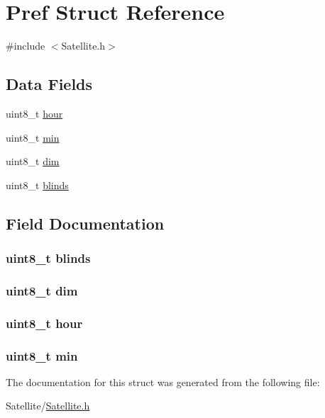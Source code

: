 \hypertarget{struct_pref}{\section{Pref Struct Reference}
\label{struct_pref}
}


{\ttfamily \#include $<$Satellite.\-h$>$}

\subsection*{Data Fields}
\begin{DoxyCompactItemize}
\item 
uint8\-\_\-t \hyperlink{struct_pref_ae5af4ff48939d13d480f87e56a9385d6}{hour}
\item 
uint8\-\_\-t \hyperlink{struct_pref_ac9b481208b43f7c37ed25e446bdec692}{min}
\item 
uint8\-\_\-t \hyperlink{struct_pref_acd6b0c9d182822b4646f744da608eb78}{dim}
\item 
uint8\-\_\-t \hyperlink{struct_pref_ad1733fa682379b1821f819f56447c66a}{blinds}
\end{DoxyCompactItemize}


\subsection{Field Documentation}
\hypertarget{struct_pref_ad1733fa682379b1821f819f56447c66a}{
\subsubsection[{blinds}]{\setlength{\rightskip}{0pt plus 5cm}uint8\-\_\-t {\bf blinds}}}\label{struct_pref_ad1733fa682379b1821f819f56447c66a}
\hypertarget{struct_pref_acd6b0c9d182822b4646f744da608eb78}{
\subsubsection[{dim}]{\setlength{\rightskip}{0pt plus 5cm}uint8\-\_\-t {\bf dim}}}\label{struct_pref_acd6b0c9d182822b4646f744da608eb78}
\hypertarget{struct_pref_ae5af4ff48939d13d480f87e56a9385d6}{
\subsubsection[{hour}]{\setlength{\rightskip}{0pt plus 5cm}uint8\-\_\-t {\bf hour}}}\label{struct_pref_ae5af4ff48939d13d480f87e56a9385d6}
\hypertarget{struct_pref_ac9b481208b43f7c37ed25e446bdec692}{
\subsubsection[{min}]{\setlength{\rightskip}{0pt plus 5cm}uint8\-\_\-t {\bf min}}}\label{struct_pref_ac9b481208b43f7c37ed25e446bdec692}


The documentation for this struct was generated from the following file\-:\begin{DoxyCompactItemize}
\item 
Satellite/\hyperlink{_satellite_8h}{Satellite.\-h}\end{DoxyCompactItemize}
